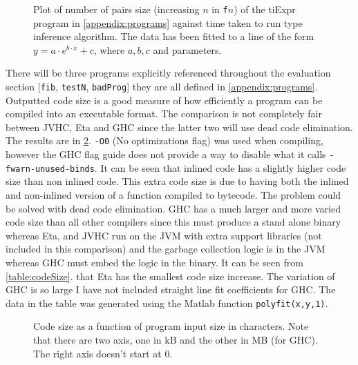 \documentclass[float=false, crop=false]{standalone}
\newlength\gwidth
\newlength\gheight
\newcommand{\importMGraph}[3]{\setlength{\gwidth}{#2}\setlength{\gheight}{#3}{#1}}
\begin{document}
\begin{figure}
  \begin{samepage}
  \importMGraph{tiTime.tex}{0.93\textwidth}{0.4\textwidth}
  \caption[Type inference runtime as a function of input size]
  {Plot of number of pairs size (increasing $n$ in \texttt{f$n$}) 
    of the tiExpr program in \cref{appendix:programs} against time taken 
    to run type inference algorithm. The data has been fitted to a line of the form
    $y = a \cdot e^{b\cdot x}+c$, where $a,b,c$ and parameters.}
  \label{plot:tiTime}
\end{samepage}
\end{figure}
There will be three programs explicitly referenced throughout the evaluation section 
[\texttt{fib}, \texttt{testN}, \texttt{badProg}] they are all defined in 
\cref{appendix:programs}.
Outputted code size is a good measure of how efficiently a program can be compiled into an executable format. 
The comparison is not completely fair between JVHC, Eta and GHC 
since the latter two will use dead code elimination. 
The results are in \cref{plot:codeSize}. \texttt{-O0} (No optimizations flag) 
was used when compiling, however the GHC flag guide \cite{haskell-flag-ref}
does not provide a way to disable what it calls \texttt{-fwarn-unused-binds}.
It can be seen that inlined code has a slightly higher code size than non inlined code. This extra code size is due to having both the inlined and 
non-inlined version of a function compiled to bytecode. 
The problem could be solved with dead code elimination. GHC has a much larger 
and more varied code size than all other compilers since this must produce a stand alone binary 
whereas Eta, and JVHC run on the JVM with extra support libraries (not included in this comparison) 
and the garbage collection logic is in the JVM whereas GHC must embed the logic in the binary. 
It can be seen from \cref{table:codeSize}. 
that Eta has the smallest code size increase. The variation of GHC is so large I have not
included straight line fit coefficients for GHC. The data in the table
was generated using the Matlab function \verb|polyfit(x,y,1)|.


\begin{figure}
  \centering
  \importMGraph{plotCodeSize.tex}{0.90\textwidth}{0.4\textwidth}
  \caption[Code size as a function of program input size in characters]
          {Code size as a function of program input size in characters. Note that 
           there are two axis, one in kB and the other in MB (for GHC). The right axis 
           doesn't start at 0.}
  \label{plot:codeSize}
\end{figure}
\end{document}

